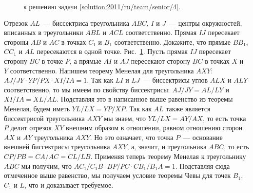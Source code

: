 \ifsolution
\begin{figure}\centering
    \caption{к решению задачи \ref{solution:2011/ru/team/senior/4}.}
    \label{fig:solution:2011/ru/team/senior/4}
\end{figure}
\fi %

\problem{}
Отрезок $AL$~--- биссектриса треугольника $ABC$, $I$ и $J$~--- центры
окружностей, вписанных в треугольники $ABL$ и $ACL$ соответственно.
Прямая $IJ$ пересекает стороны $AB$ и $AC$ в точках $C_1$ и $B_1$
соответственно.
Докажите, что прямые $B B_1$, $C C_1$ и $AL$ пересекаются в одной точке.
\solution
\label{solution:2011/ru/team/senior/4}%
Рис.~\ref{fig:solution:2011/ru/team/senior/4}.
Пусть прямая $IJ$ пересекает сторону $BC$ в точке $P$, а прямые $AI$ и $AJ$
пересекают сторону $BC$ в точках $X$ и $Y$ соответственно.
Напишем теорему Менелая для треугольника $AXY$:
\(
    AJ / JY
    \cdot
    YP / PX
    \cdot
    XI / IA
=
    1
\).
Так как $LI$ и $LJ$~--- биссектрисы углов $ALX$ и $ALY$ соответственно, то мы
имеем по свойству биссектрисы:
$AJ / JY = AL / LY$ и $XI / IA = XL / AL$.
Подставляя это в написанное выше равенство из теоремы Менелая, будем иметь
$YL / LX = YP / XP$.
Так как $AL$ также является биссектрисой треугольника $AXY$ мы знаем, что
$YL / LX = AY / AX$, то есть точка $P$ делит отрезок $XY$ внешним
образом в отношении, равном отношению сторон $AX$ и $AY$ треугольника $AXY$.
Но это означает, что точка $P$~--- основание внешней биссектрисы треугольника
$AXY$, а, значит, и треугольника $ABC$, то есть
$CP / PB = CA / AC = CL / LB$.
Применяя теперь теорему Менелая к треугольнику $ABC$ мы получим, что
\(
    A C_1 / C_1 B
    \cdot
    BP / PC
    \cdot
    C B_1 / B_1 A
=
    1
\).
Подставляя сюда отмеченное выше равенство, мы получаем условие теоремы Чевы для
точек $B_1$, $C_1$ и $L$, что и доказывает требуемое.
\endproblem
